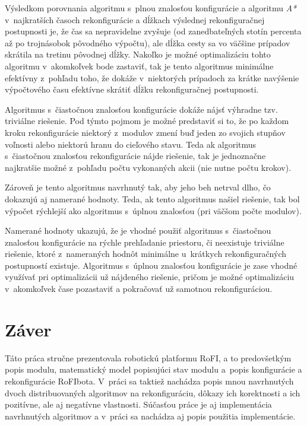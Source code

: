 \documentclass[
  printed, %
  oneside, %
  notable,   %
  nolof,     %
  nolot,     %
]{fithesis3}
\begin{document}
Výsledkom porovnania algoritmu s~plnou znalosťou konfigurácie a algoritmu \textit{A*} v~najkratších časoch rekonfigurácie a dĺžkach výslednej rekonfiguračnej postupnosti je, že čas sa nepravidelne zvyšuje (od zanedbateľných stotín percenta až po trojnásobok pôvodného výpočtu), ale dĺžka cesty sa vo väčšine prípadov skrátila na tretinu pôvodnej dĺžky. Nakoľko je možné optimalizáciu tohto algoritmu v~akomkoľvek bode zastaviť, tak je tento algoritmus minimálne efektívny z~pohľadu toho, že dokáže v~niektorých prípadoch za krátke navýšenie výpočtového času efektívne skrátiť dĺžku rekonfiguračnej postupnosti. 

Algoritmus s~čiastočnou znalosťou konfigurácie dokáže nájsť výhradne tzv. triviálne riešenie. Pod týmto pojmom je možné predstaviť si to, že po každom kroku rekonfigurácie niektorý z~modulov zmení buď jeden zo svojich stupňov voľnosti alebo niektorú hranu do cieľového stavu. Teda ak algoritmus s~čiastočnou znalosťou rekonfigurácie nájde riešenie, tak je jednoznačne najkratšie možné z~pohľadu počtu vykonaných akcii (nie nutne počtu krokov). 

Zároveň je tento algoritmus navrhnutý tak, aby jeho beh netrval dlho, čo dokazujú aj namerané hodnoty. Teda, ak tento algoritmus našiel riešenie, tak bol výpočet rýchlejší ako algoritmus s~úplnou znalosťou (pri väčšom počte modulov). 

Namerané hodnoty ukazujú, že je vhodné použiť algoritmus s~čiastočnou znalosťou konfigurácie na rýchle prehľadanie priestoru, či neexistuje triviálne riešenie, ktoré z~nameraných hodnôt minimálne u~krátkych rekonfiguračných postupností existuje. Algoritmus s~úplnou znalosťou konfigurácie je zase vhodné využívať pri optimalizácii už nájdeného riešenie, pričom je možné optimalizáciu v~akomkoľvek čase pozastaviť a pokračovať už samotnou rekonfiguráciou. 







\chapter{Záver}
Táto práca stručne prezentovala robotickú platformu RoFI, a to predovšetkým popis modulu, matematický model popisujúci stav modulu a~popis konfigurácie a rekonfigurácie RoFIbota. V~práci sa taktiež nachádza popis mnou navrhnutých dvoch distribuovaných algoritmov na rekonfiguráciu, dôkazy ich korektnosti a ich pozitívne, ale aj negatívne vlastnosti. Súčasťou práce je aj implementácia navrhnutých algoritmov a v~práci sa nachádza aj popis použitia implementácie. 
\end{document}

